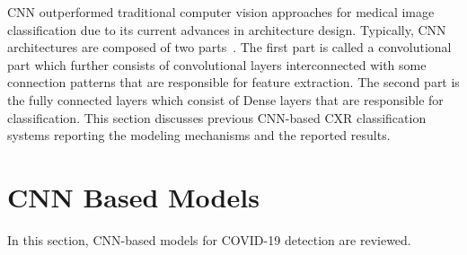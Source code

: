 


CNN outperformed traditional computer vision approaches for medical image classification due to its current advances in architecture design. Typically, CNN architectures are composed of two parts~\cite{krizhevsky2012imagenet}. The first part is called a convolutional part which further consists of convolutional layers interconnected with some connection patterns that are responsible for feature extraction. The second part is the fully connected layers which consist of Dense layers that are responsible for classification. This section discusses previous CNN-based CXR classification systems reporting the modeling mechanisms and the reported results.
\section{CNN Based Models}
In this section, CNN-based models for COVID-19 detection are reviewed.
